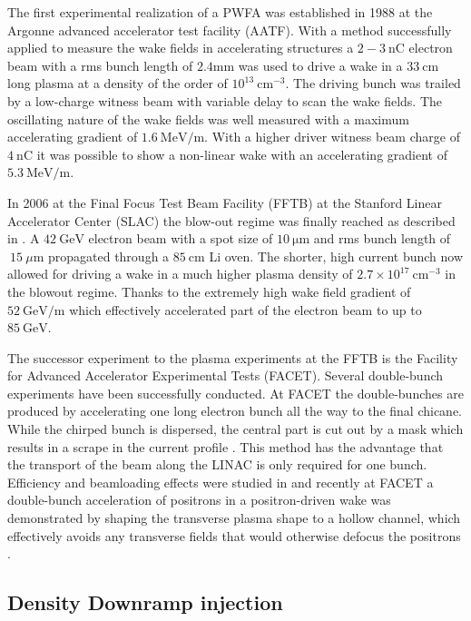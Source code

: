 The first experimental realization of a PWFA was established in 1988 at the Argonne advanced accelerator test facility (AATF)\cite{rosenzweig1988experimental}. With a method successfully applied to measure the wake fields in accelerating structures
a $2-3\ \mathrm{nC}$ electron beam with a rms bunch length of $2.4 \mathrm{mm}$ was used to drive a wake in a $33\ \mathrm{cm} $ long plasma at a density of the order of $ 10^{13}\ \mathrm{cm}^{-3}$. The driving bunch was trailed by a low-charge witness beam with variable delay to scan the wake fields.
The oscillating nature of the wake fields was well measured with a maximum accelerating gradient of $1.6\ \mathrm{MeV/m}$. 
With a higher driver witness beam charge of $4\ \mathrm{nC}$ \cite{figueroa1988direct} it was possible to show a non-linear wake with an accelerating gradient of $5.3\ \mathrm{MeV/m}$. 

In 2006 at the Final Focus Test Beam Facility (FFTB) at the Stanford Linear Accelerator Center (SLAC) the blow-out regime was finally reached as described in \cite{blumenfeld2007energyDoubling}.
A $42\ \mathrm{GeV}$ electron beam with a spot size of $10\ \mathrm{\mu m}$ and rms bunch length of $~15\ \mu\mathrm{m}$ propagated through a $85\ \mathrm{cm}$ Li oven. The shorter, high current bunch now allowed for driving a wake in a much higher plasma density of $2.7\times 10^{17}\ \mathrm{cm}^{-3} $ in the blowout regime. Thanks to the extremely high wake field gradient of $52\ \mathrm{GeV/m}$ which effectively accelerated part of the electron beam to up to $85\ \mathrm{GeV}$.

The successor experiment to the plasma experiments at the FFTB is the Facility for Advanced Accelerator Experimental Tests (FACET)\cite{clarke2012facet}. Several double-bunch experiments have been successfully conducted.  
At FACET the double-bunches are produced by accelerating one long electron bunch all the way to the final chicane. 
While the chirped bunch is dispersed, the central part is cut out by a mask which results in a scrape in the current profile  \cite{hogan2010FACET}. This method has the advantage that the transport of the beam along the LINAC is only required for one bunch.
Efficiency and beamloading effects were studied in \cite{litos2014high} and recently at FACET a double-bunch acceleration of positrons in a positron-driven wake was demonstrated by shaping the transverse plasma shape to a hollow channel, which effectively avoids any transverse fields that would otherwise defocus the positrons \cite{ThesisGessner}.
\subsection{Density Downramp injection}

